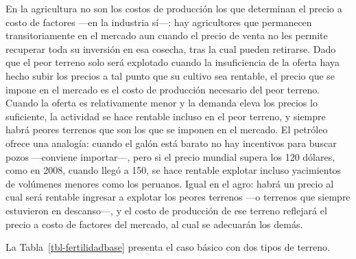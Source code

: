 \documentclass[
  man,
  floatsintext,
  longtable,
  a4paper,
  nolmodern,
  notxfonts,
  notimes,
  12pt,
  colorlinks=true,linkcolor=blue,citecolor=blue,urlcolor=blue]{apa7}
\begin{document}
En la agricultura no son los costos de producción los que determinan el
precio a costo de factores ---en la industria sí---: hay agricultores
que permanecen transitoriamente en el mercado aun cuando el precio de
venta no les permite recuperar toda su inversión en esa cosecha, tras la
cual pueden retirarse. Dado que el peor terreno solo será explotado
cuando la insuficiencia de la oferta haya hecho subir los precios a tal
punto que su cultivo sea rentable, el precio que se impone en el mercado
es el costo de producción necesario del peor terreno. Cuando la oferta
es relativamente menor y la demanda eleva los precios lo suficiente, la
actividad se hace rentable incluso en el peor terreno, y siempre habrá
peores terrenos que son los que se imponen en el mercado. El petróleo
ofrece una analogía: cuando el galón está barato no hay incentivos para
buscar pozos ---conviene importar---, pero si el precio mundial supera
los 120 dólares, como en 2008, cuando llegó a 150, se hace rentable
explotar incluso yacimientos de volúmenes menores como los peruanos.
Igual en el agro: habrá un precio al cual será rentable ingresar a
explotar los peores terrenos ---o terrenos que siempre estuvieron en
descanso---, y el costo de producción de ese terreno reflejará el precio
a costo de factores del mercado, al cual se adecuarán los demás.

La Tabla~\ref{tbl-fertilidadbase} presenta el caso básico con dos tipos
de terreno.
\end{document}
